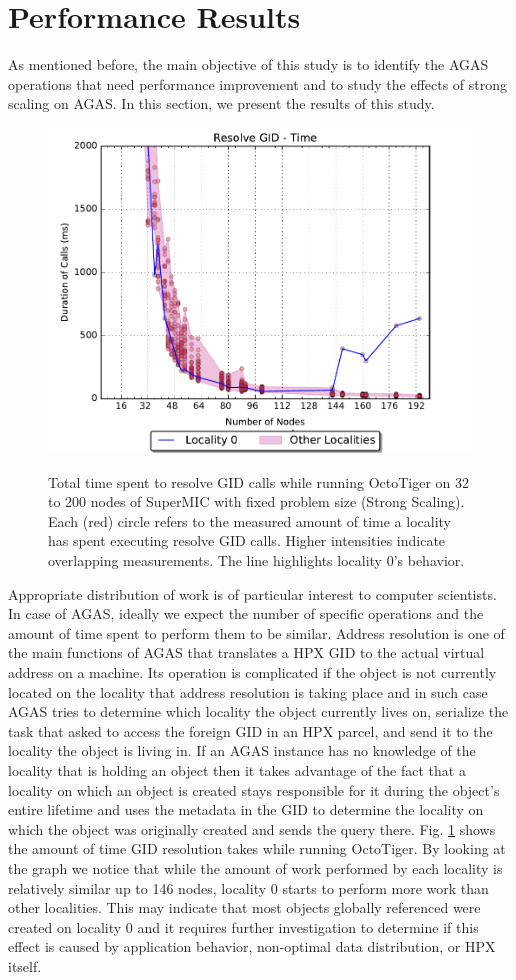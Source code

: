 \section{Performance Results}
\label{results}

As mentioned before, the main objective of this study is to identify the AGAS
operations that need performance improvement and to study the effects of strong
scaling on AGAS. In this section, we present the results of this study.

\begin{figure}[h]
    \centering
    \caption{Total time spent to resolve GID calls while running OctoTiger on 32 to 200 nodes of SuperMIC with fixed problem size (Strong Scaling). Each (red) circle refers to the measured amount of time a locality has spent executing resolve GID calls. Higher intensities indicate overlapping measurements. The line highlights locality 0's behavior.}
    \includegraphics[width=.54\textwidth,height=\textheight,keepaspectratio]{graphs/octotiger_resolve_gid_time}
    \label{fig:octgr_strong_resolve_gid_time}
\end{figure}

Appropriate distribution of work is of particular interest to computer
scientists. In case of AGAS, ideally we expect the number of specific
operations and the amount of time spent to perform them to be similar. Address
resolution is one of the main functions of AGAS that translates a HPX GID to
the actual virtual address on a machine. Its operation is complicated if the
object is not currently located on the locality that address resolution is taking
place and in such case AGAS tries to determine which locality the object
currently lives on, serialize the task that asked to access the foreign GID in
an HPX parcel, and send it to the locality the object is living in. If an AGAS
instance has no knowledge of the locality that is holding an object then it
takes advantage of the fact that a locality on which an object is created stays
responsible for it during the object's entire lifetime and uses the metadata in
the GID to determine the locality on which the object was originally created and
sends the query there. Fig. \ref{fig:octgr_strong_resolve_gid_time} shows the
amount of time GID resolution takes while running OctoTiger. By looking at
the graph we notice that while the amount of work performed by each
locality is relatively similar up to 146 nodes, locality 0 starts to perform
more work than other localities. This may indicate that most objects globally
referenced were created on locality 0 and it requires further investigation to
determine if this effect is caused by application behavior, non-optimal data
distribution, or HPX itself.

